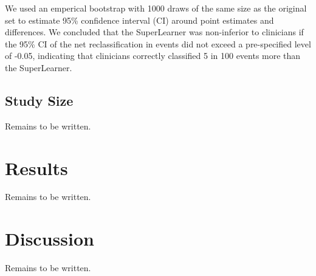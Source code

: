 \documentclass[10pt,letterpaper]{article}\usepackage[]{graphicx}\usepackage[]{color}
\begin{document}
We used an emperical bootstrap with 1000 draws of the same size as the original
set to estimate 95\% confidence interval (CI) around point estimates and
differences. We concluded that the SuperLearner was non-inferior to clinicians
if the 95\% CI of the net reclassification in events did not exceed a
pre-specified level of -0.05, indicating that clinicians correctly classified 5
in 100 events more than the SuperLearner.


\subsection*{Study Size}
Remains to be written.

\section*{Results}
Remains to be written.
\section*{Discussion}
Remains to be written.



\end{document}
